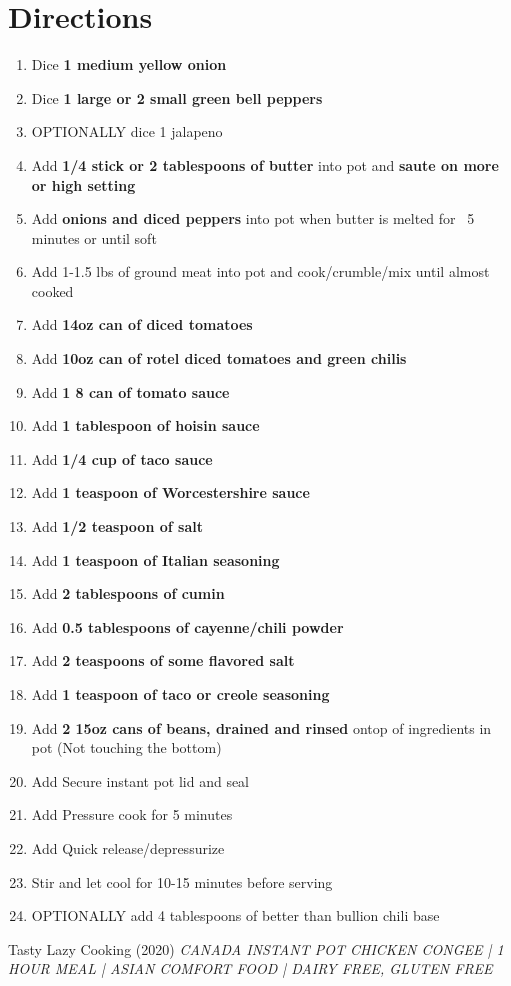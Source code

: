 \documentclass{article}
\begin{document}
\section{Directions}
\begin{enumerate}
    \item Dice \textbf{1 medium yellow onion}
    \item Dice \textbf{1 large or 2 small green bell peppers}
    \item OPTIONALLY dice {1 jalapeno}
    \item Add \textbf{1/4 stick or 2 tablespoons of butter} into pot and \textbf{saute on more or high setting}
    \item Add \textbf{onions and diced peppers} into pot when butter is melted for ~5 minutes or until soft
    \item Add {1-1.5 lbs of ground meat} into pot and cook/crumble/mix until almost cooked
    \item Add \textbf{14oz can of diced tomatoes}
    \item Add \textbf{10oz can of rotel diced tomatoes and green chilis}
    \item Add \textbf{1 8 can of tomato sauce}
    \item Add \textbf{1 tablespoon of hoisin sauce}
    \item Add \textbf{1/4 cup of taco sauce}
    \item Add \textbf{1 teaspoon of Worcestershire sauce}
    \item Add \textbf{1/2 teaspoon of salt}
    \item Add \textbf{1 teaspoon of Italian seasoning}
    \item Add \textbf{2 tablespoons of cumin}
    \item Add \textbf{0.5 tablespoons of cayenne/chili powder}
    \item Add \textbf{2 teaspoons of some flavored salt}
    \item Add \textbf{1 teaspoon of taco or creole seasoning}
    \item Add \textbf{2 15oz cans of beans, drained and rinsed} ontop of ingredients in pot (Not touching the bottom)
    \item Add Secure instant pot lid and seal
    \item Add Pressure cook for 5 minutes
    \item Add Quick release/depressurize
    \item Stir and let cool for 10-15 minutes before serving
    \item OPTIONALLY add 4 tablespoons of better than bullion chili base
 
\end{enumerate}

\begin{thebibliography}{9}
Tasty Lazy Cooking (2020) \emph{CANADA
INSTANT POT CHICKEN CONGEE | 1 HOUR MEAL | ASIAN COMFORT FOOD | DAIRY FREE, GLUTEN FREE}
\end{thebibliography}
\end{document}
